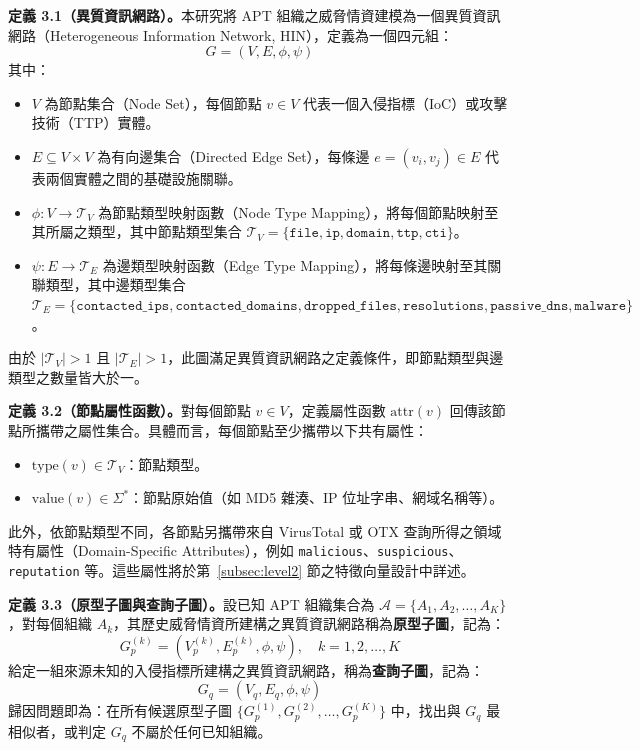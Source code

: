 \begin{ZhChapter}
\noindent\textbf{定義 3.1（異質資訊網路）。}本研究將 APT 組織之威脅情資建模為一個異質資訊網路（Heterogeneous Information Network, HIN），定義為一個四元組：
\begin{equation}
    G = (V, E, \phi, \psi)
    \label{eq:hin-def}
\end{equation}
其中：
\begin{itemize}
    \item $V$ 為節點集合（Node Set），每個節點 $v \in V$ 代表一個入侵指標（IoC）或攻擊技術（TTP）實體。
    \item $E \subseteq V \times V$ 為有向邊集合（Directed Edge Set），每條邊 $e = (v_i, v_j) \in E$ 代表兩個實體之間的基礎設施關聯。
    \item $\phi: V \rightarrow \mathcal{T}_V$ 為節點類型映射函數（Node Type Mapping），將每個節點映射至其所屬之類型，其中節點類型集合 $\mathcal{T}_V = \{\texttt{file}, \texttt{ip}, \texttt{domain}, \texttt{ttp}, \texttt{cti}\}$。
    \item $\psi: E \rightarrow \mathcal{T}_E$ 為邊類型映射函數（Edge Type Mapping），將每條邊映射至其關聯類型，其中邊類型集合 $\mathcal{T}_E = \{\texttt{contacted\_ips}, \texttt{contacted\_domains}, \texttt{dropped\_files}, \texttt{resolutions}, \texttt{passive\_dns}, \texttt{malware}\}$。
\end{itemize}
由於 $|\mathcal{T}_V| > 1$ 且 $|\mathcal{T}_E| > 1$，此圖滿足異質資訊網路之定義條件，即節點類型與邊類型之數量皆大於一。

\noindent\textbf{定義 3.2（節點屬性函數）。}對每個節點 $v \in V$，定義屬性函數 $\text{attr}(v)$ 回傳該節點所攜帶之屬性集合。具體而言，每個節點至少攜帶以下共有屬性：
\begin{itemize}
    \item $\text{type}(v) \in \mathcal{T}_V$：節點類型。
    \item $\text{value}(v) \in \Sigma^*$：節點原始值（如 MD5 雜湊、IP 位址字串、網域名稱等）。
\end{itemize}
此外，依節點類型不同，各節點另攜帶來自 VirusTotal 或 OTX 查詢所得之領域特有屬性（Domain-Specific Attributes），例如 \texttt{malicious}、\texttt{suspicious}、\texttt{reputation} 等。這些屬性將於第~\ref{subsec:level2} 節之特徵向量設計中詳述。

\noindent\textbf{定義 3.3（原型子圖與查詢子圖）。}設已知 APT 組織集合為 $\mathcal{A} = \{A_1, A_2, \ldots, A_K\}$，對每個組織 $A_k$，其歷史威脅情資所建構之異質資訊網路稱為\textbf{原型子圖}，記為：
\begin{equation}
    G_p^{(k)} = (V_p^{(k)}, E_p^{(k)}, \phi, \psi), \quad k = 1, 2, \ldots, K
    \label{eq:prototype-def}
\end{equation}
給定一組來源未知的入侵指標所建構之異質資訊網路，稱為\textbf{查詢子圖}，記為：
\begin{equation}
    G_q = (V_q, E_q, \phi, \psi)
    \label{eq:query-def}
\end{equation}
歸因問題即為：在所有候選原型子圖 $\{G_p^{(1)}, G_p^{(2)}, \ldots, G_p^{(K)}\}$ 中，找出與 $G_q$ 最相似者，或判定 $G_q$ 不屬於任何已知組織。


\end{ZhChapter}

